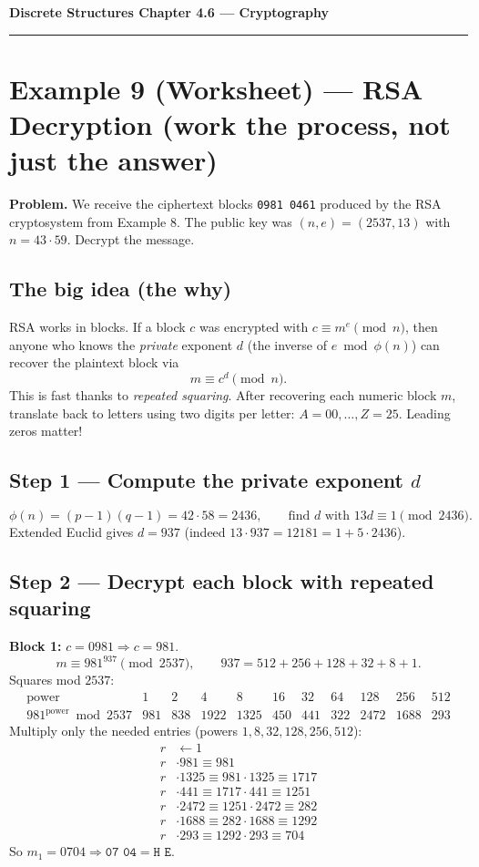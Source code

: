 \documentclass[12pt]{article}
\begin{document}
{\large \textbf{Discrete Structures \qquad Chapter 4.6 — Cryptography}}

\hrule
\vspace{0.6em}

\section*{Example 9 (Worksheet) — RSA Decryption (work the process, not just the answer)}

\textbf{Problem.} We receive the ciphertext blocks \texttt{0981 0461} produced by the RSA cryptosystem from Example 8. The public key was \((n,e)=(2537,13)\) with \(n=43\cdot59\). Decrypt the message.

\subsection*{The big idea (the why)}
RSA works in blocks. If a block \(c\) was encrypted with \(c \equiv m^e \pmod{n}\), then anyone who knows the \emph{private} exponent \(d\) (the inverse of \(e\bmod\phi(n)\)) can recover the plaintext block via
\[
m \equiv c^d \pmod{n}.
\]
This is fast thanks to \emph{repeated squaring}. After recovering each numeric block \(m\), translate back to letters using two digits per letter: \(A=00,\dots, Z=25\). Leading zeros matter!

\subsection*{Step 1 — Compute the private exponent \(d\)}
\[
\phi(n)=(p-1)(q-1)=42\cdot58=2436,\qquad \text{find }d\text{ with }13d\equiv 1\pmod{2436}.
\]
Extended Euclid gives \(d=937\) (indeed \(13\cdot 937=12181=1+5\cdot2436\)).

\subsection*{Step 2 — Decrypt each block with repeated squaring}

\textbf{Block 1:} \(c=0981\Rightarrow c=981\).
\[
m \equiv 981^{937}\pmod{2537},\qquad 937=512+256+128+32+8+1.
\]
Squares mod \(2537\):
\[
\begin{array}{r|rrrrrrrrr}
\text{power} & 1 & 2 & 4 & 8 & 16 & 32 & 64 & 128 & 256 & 512\\\hline
981^{\text{power}} \bmod 2537 & 
981 & 838 & 1922 & 1325 & 450 & 441 & 322 & 2472 & 1688 & 293
\end{array}
\]
Multiply only the needed entries (powers \(1,8,32,128,256,512\)):
\[
\begin{aligned}
r&\leftarrow 1\\
r&\cdot 981 \equiv 981\\
r&\cdot 1325 \equiv  981\cdot1325 \equiv  1717\\
r&\cdot 441 \equiv  1717\cdot441 \equiv  1251\\
r&\cdot 2472 \equiv  1251\cdot2472 \equiv  282\\
r&\cdot 1688 \equiv  282\cdot1688 \equiv  1292\\
r&\cdot 293 \equiv  1292\cdot293 \equiv  \boxed{704}
\end{aligned}
\]
So \(m_1=0704\Rightarrow \texttt{07 04}=\texttt{H E}\).
\end{document}
